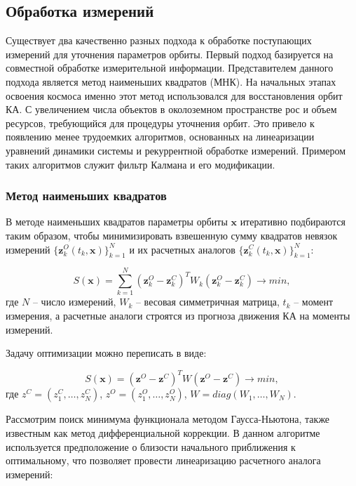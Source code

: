 \subsection{Обработка измерений}
Существует два качественно разных подхода к обработке поступающих измерений
для уточнения параметров орбиты.
Первый подход базируется на совместной обработке измерительной информации. 
Представителем данного подхода является метод наименьших квадратов (МНК).
На начальных этапах освоения космоса именно этот метод использовался
для восстановления орбит КА. 
С увеличением числа объектов в околоземном пространстве рос и объем ресурсов, 
требующийся для процедуры уточнения орбит.
Это привело к появлению менее трудоемких алгоритмов, основанных 
на линеаризации уравнений динамики системы и рекуррентной обработке измерений. Примером таких
алгоритмов служит фильтр Калмана и его модификации.

\subsubsection{Метод наименьших квадратов}
В методе наименьших квадратов параметры орбиты $\mathbf{x}$ итеративно 
подбираются таким образом,
чтобы минимизировать взвешенную сумму квадратов невязок измерений 
$\{\mathbf{z}^O_k (t_k, \mathbf{x})\}_{k=1}^N$ 
и их расчетных аналогов $\{\mathbf{z}_k^C (t_k, \mathbf{x})\}_{k=1}^N$:

\begin{equation}
    S(\mathbf{x}) = \sum_{k=1}^{N} (\mathbf{z}^O_k - \mathbf{z}^C_k)^T W_k 
    (\mathbf{z}^O_k - \mathbf{z}^C_k) \rightarrow min,
\end{equation}
где $N$ -- число измерений, $W_k$ -- весовая симметричная матрица, $t_k$ -- момент измерения, а
расчетные аналоги строятся из прогноза движения КА на моменты измерений.

Задачу оптимизации можно переписать в виде:

\begin{equation*}
    S(\mathbf{x}) = (\mathbf{z}^O - \mathbf{z}^C)^T W (\mathbf{z}^O - \mathbf{z}^C) \rightarrow min,
\end{equation*}
где $z^C = (z_1^C, \dots, z_N^C)$, $z^O = (z_1^O, \dots, z_N^O)$, $W = diag(W_1, \dots, W_N)$.

Рассмотрим поиск минимума функционала методом Гаусса-Ньютона, также
известным как метод дифференциальной коррекции. В данном алгоритме 
используется предположение о близости начального приближения к оптимальному, что позволяет
провести линеаризацию расчетного аналога измерений:

